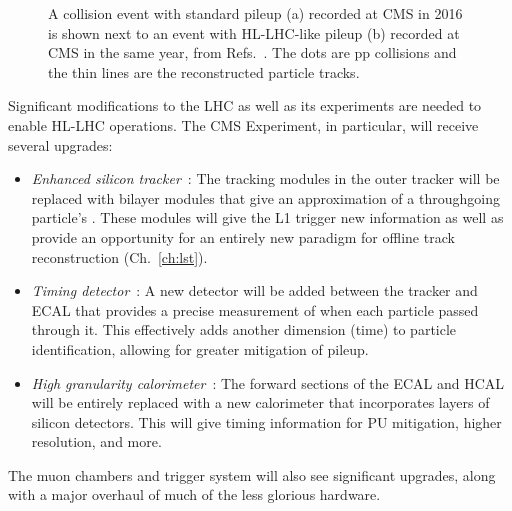 \begin{figure}[!htb]
    \centering
    \qquad
    \caption[A collision event with standard pileup and with HL-LHC-like pileup, both recorded in 2016]{
        A collision event with standard pileup (a) recorded at CMS in 2016 is shown next to an event with HL-LHC-like pileup (b) recorded at CMS in the same year, from Refs.~\cite{NormalPU2016, HighPU2016}.
        The dots are pp collisions and the thin lines are the reconstructed particle tracks.
    }
    \label{fig:pileup}
\end{figure}

Significant modifications to the LHC as well as its experiments are needed to enable HL-LHC operations. 
The CMS Experiment, in particular, will receive several upgrades: 
\begin{itemize}
    \item{
        \textit{Enhanced silicon tracker}~\cite{CERN-LHCC-2017-009}: 
        The tracking modules in the outer tracker will be replaced with bilayer modules that give an approximation of a throughgoing particle's \pt. 
        These modules will give the L1 trigger new information as well as provide an opportunity for an entirely new paradigm for offline track reconstruction (Ch.~\ref{ch:lst}). 
    }
    \item{
        \textit{Timing detector}~\cite{CERN-LHCC-2017-027}: 
        A new detector will be added between the tracker and ECAL that provides a precise measurement of when each particle passed through it. 
        This effectively adds another dimension (time) to particle identification, allowing for greater mitigation of pileup. 
    }
    \item{
            \textit{High granularity calorimeter}~\cite{CERN-LHCC-2017-023, CERN-LHCC-2017-011}: 
        The forward sections of the ECAL and HCAL will be entirely replaced with a new calorimeter that incorporates layers of silicon detectors. 
        This will give timing information for PU mitigation, higher resolution, and more. 
    }
\end{itemize}
The muon chambers and trigger system will also see significant upgrades, along with a major overhaul of much of the less glorious hardware.
